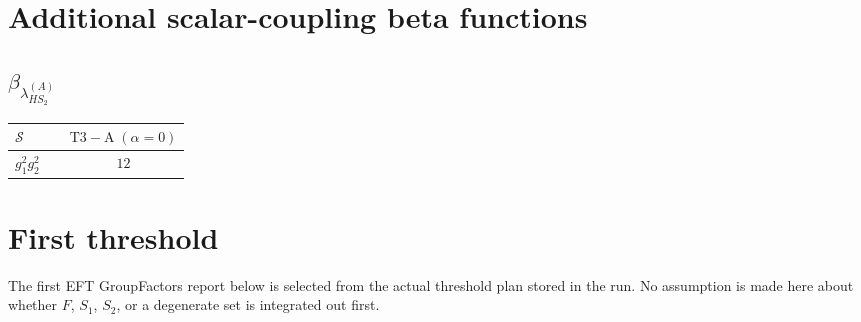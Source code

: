 \documentclass[9pt]{article}
\begin{document}
\section*{Additional scalar-coupling beta functions}
\subsection*{$ \beta_{\lambda_{HS_2}^{(A)}} $}
\begin{longtable}{@{}p{0.31\linewidth}c@{}}
\toprule
$\mathcal{S}$ & $ \mathrm{T3-A}\;(\alpha=0) $ \\
\midrule
$ g_1^2g_2^2 $ & $ 12 $ \\
\bottomrule
\end{longtable}
\section*{First threshold}
The first EFT GroupFactors report below is selected from the actual threshold plan stored in the run.  No assumption is made here about whether $F$, $S_1$, $S_2$, or a degenerate set is integrated out first.
\end{document}
